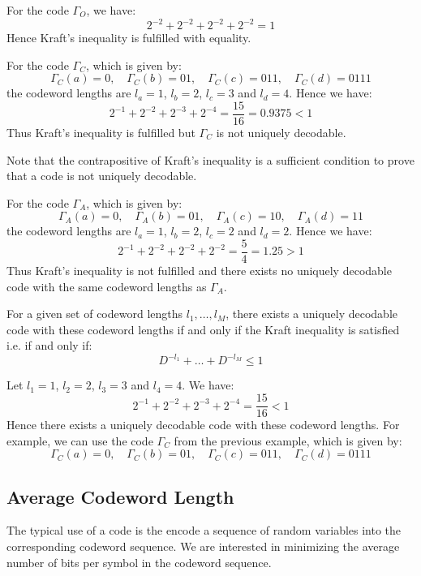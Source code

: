 \begin{eg}
    For the code $\Gamma_O$, we have:
    \[
        2^{-2} + 2^{-2} + 2^{-2} + 2^{-2} = 1
    \]
    Hence Kraft's inequality is fulfilled with equality.
\end{eg}

\begin{eg}
    For the code $\Gamma_C$, which is given by:
    \[
        \Gamma_C(a) = 0, \quad \Gamma_C(b) = 01, \quad \Gamma_C(c) = 011, \quad \Gamma_C(d) = 0111
    \]
    the codeword lengths are $l_a = 1$, $l_b = 2$, $l_c = 3$ and $l_d = 4$. Hence we have:
    \[
        2^{-1} + 2^{-2} + 2^{-3} + 2^{-4} = \frac{15}{16} = 0.9375 < 1
    \]
    Thus Kraft's inequality is fulfilled but $\Gamma_C$ is not uniquely decodable.
\end{eg}
Note that the contrapositive of Kraft's inequality is a sufficient condition to prove that a code is not uniquely decodable. 

\begin{eg}
    For the code $\Gamma_A$, which is given by:
    \[
        \Gamma_A(a) = 0, \quad \Gamma_A(b) = 01, \quad \Gamma_A(c) = 10, \quad \Gamma_A(d) = 11
    \]
    the codeword lengths are $l_a = 1$, $l_b = 2$, $l_c = 2$ and $l_d = 2$. Hence we have:
    \[
        2^{-1} + 2^{-2} + 2^{-2} + 2^{-2} = \frac{5}{4} = 1.25 > 1
    \]
    Thus Kraft's inequality is not fulfilled and there exists no uniquely decodable code with the same codeword lengths as $\Gamma_A$.
\end{eg}

\begin{theorem}
    For a given set of codeword lengths $l_1, \ldots, l_M$, there exists a uniquely decodable code with these codeword lengths if and only if the Kraft inequality is satisfied i.e. if and only if:
    \[
        D^{-l_1} + \ldots + D^{-l_M} \leq 1
    \]
\end{theorem}

\begin{eg}
    Let $l_1 = 1$, $l_2 = 2$, $l_3 = 3$ and $l_4 = 4$. We have:
    \[
        2^{-1} + 2^{-2} + 2^{-3} + 2^{-4} = \frac{15}{16} < 1
    \]
    Hence there exists a uniquely decodable code with these codeword lengths. For example, we can use the code $\Gamma_C$ from the previous example, which is given by:
    \[
        \Gamma_C(a) = 0, \quad \Gamma_C(b) = 01, \quad \Gamma_C(c) = 011, \quad \Gamma_C(d) = 0111
    \]
\end{eg}

\subsection{Average Codeword Length}
The typical use of a code is the encode a sequence of random variables into the corresponding codeword sequence. We are interested in minimizing the average number of bits per symbol in the codeword sequence.


